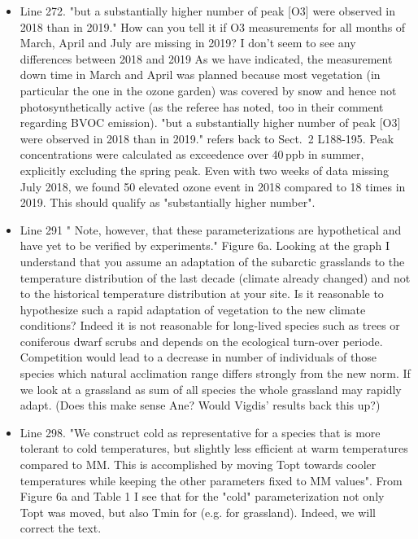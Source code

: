 \documentclass{scrartcl}
\begin{document}
\begin{itemize}
\item {\color{blue}Line 272. "but a substantially higher number of peak [O3] were observed in 2018 than in 2019." How can you tell it if O3 measurements for all months of March, April and July are missing in 2019? I don't seem to see any differences between 2018 and 2019}
As we have indicated, the measurement down time in March and April was planned because most vegetation (in particular the one in the ozone garden) was covered by snow and hence not photosynthetically active (as the referee has noted, too in their comment regarding BVOC emission). "but a substantially higher number of peak [O3] were observed in 2018 than in 2019." refers back to Sect.~2 L188-195. Peak concentrations were calculated as exceedence over 40\,ppb in summer, explicitly excluding the spring peak. Even with two weeks of data missing July 2018, we found 50 elevated ozone event in 2018 compared to 18 times in 2019. This should qualify as "substantially higher number".

\item {\color{blue}Line 291 " Note, however, that these parameterizations are hypothetical and have yet to be verified by experiments." Figure 6a. Looking at the graph I understand that you assume an adaptation of the subarctic grasslands to the temperature distribution of the last decade (climate already changed) and not to the historical temperature distribution at your site. Is it reasonable to hypothesize such a rapid adaptation of vegetation to the new climate conditions?} Indeed it is not reasonable for long-lived species such as trees or coniferous dwarf scrubs and depends on the ecological turn-over periode. Competition would lead to a decrease in number of individuals of those species which natural acclimation range differs strongly from the new norm. If we look at a grassland as sum of all species the whole grassland may rapidly adapt. (Does this make sense Ane? Would Vigdis' results back this up?) 

\item {\color{blue}Line 298. "We construct cold as representative for a species that is more tolerant to cold temperatures, but slightly less efficient at warm temperatures compared to MM. This is accomplished by moving Topt towards cooler temperatures while keeping the other parameters fixed to MM values".
From Figure 6a and Table 1 I see that for the "cold" parameterization not only Topt was moved, but also Tmin for (e.g. for grassland).}
Indeed, we will correct the text.


\end{itemize}
\end{document}
